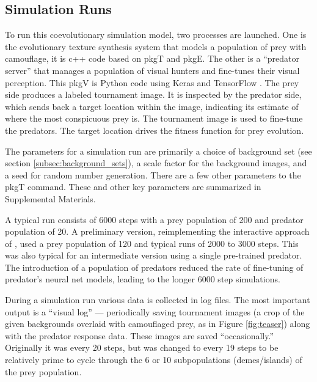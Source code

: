 \documentclass[acmtog]{acmart}
\newcommand{\texsyn}[0]{pkgT}
\newcommand{\lazypredator}[0]{pkgE}
\newcommand{\predatoreye}[0]{pkgV}
\begin{document}
\par


\subsection{Simulation Runs}
To run this coevolutionary simulation model, two processes are launched. One is the evolutionary texture synthesis system that models a population of prey with camouflage, it is c++ code based on \texsyn{} and \lazypredator{}. The other is a “predator server” that manages a population of visual hunters and fine-tunes their visual perception. This \predatoreye{} is Python code using Keras \cite{chollet_keras_2015} and TensorFlow \cite{tensorflow_whitepaper_2015}. The prey side produces a labeled tournament image. It is inspected by the predator side, which sends back a target location within the image, indicating its estimate of where the most conspicuous prey is. The tournament image is used to fine-tune the predators. The target location drives the fitness function for prey evolution.
\par
The parameters for a simulation run are primarily a choice of background set (see section \ref{subsec:background_sets}), a scale factor for the background images, and a seed for random number generation. There are a few other parameters to the \texsyn{} command. These and other key parameters are summarized in Supplemental Materials.
\par
A typical run consists of 6000 steps with a prey population of 200 and predator population of 20. A preliminary version, reimplementing the interactive approach of \citet{reynolds_iec_2011}, used a prey population of 120 and typical runs of 2000 to 3000 steps. This was also typical for an intermediate version using a single pre-trained predator. The introduction of a population of predators reduced the rate of fine-tuning of predator's neural net models, leading to the longer 6000 step simulations.
\par
During a simulation run various data is collected in log files. The most important output is a “visual log” — periodically saving tournament images (a crop of the given backgrounds overlaid with camouflaged prey, as in Figure \ref{fig:teaser}) along with the predator response data. These images are saved “occasionally.” Originally it was every 20 steps, but was changed to every 19 steps to be relatively prime to cycle through the 6 or 10 subpopulations (demes/islands) of the prey population.
\par
\end{document}
